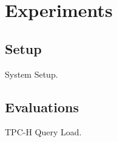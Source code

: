 \presec
\section{Experiments} \postsec
\label{sec:exp}

\presub
\subsection{Setup} \postsub
\label{subsec:impl}
System Setup.

\presub
\subsection{Evaluations} \postsub
\label{subsec:expr}
TPC-H Query Load.